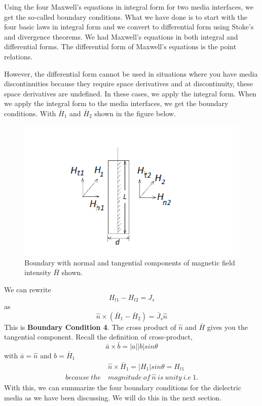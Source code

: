 Using the four Maxwell's equations in integral form for two media interfaces, we get the so-called boundary conditions. What we have done is to start with the four basic laws in integral form and we convert to differential form using Stoke's and divergence theorems. We had Maxwell's equations in both integral and differential forms. The differential form of Maxwell's equations is the point relations.

However, the differential form cannot be used in situations where you have media discontinuities because they require space derivatives and at discontinuity, these space derivatives are undefined. In these cases, we apply the integral form. When we apply the integral form to the media interfaces, we get the boundary conditions. With $\bar{H}_1$ and $\bar{H}_2$ shown in the figure below.
\begin{figure}[h]
\centering
\includegraphics[width=1\linewidth]{./graphics/diemedium4_2_2}
\caption{Boundary with normal and tangential components of magnetic field intensity $\bar{H}$ shown.}
\end{figure}

We can rewrite 
\begin{equation*}
H_{t1} - H_{t2} = J_s
\end{equation*}
as
\begin{equation}
\hat{n} \times (\bar{H}_1 - \bar{H}_2) = \bar{J}_s\hat{n}
\end{equation}
This is \textbf{Boundary Condition 4}. The cross product of $\hat{n}$ and $\bar{H}$ gives you the tangential component. Recall the definition of cross-product,
\begin{equation*}
\bar{a}\times\bar{b} = \left|a \right| \left|b \right|sin\theta 
\end{equation*}
with $\bar{a} = \hat{n}$ and $ b = \bar{H}_1$
\begin{align*}
&\hat{n}\times\bar{H}_1 = \left|H_1 \right|sin\theta = H_{t1} \\ because\ the\ & magnitude\ of\ \hat{n}\ is\ unity\ i.e\ 1.
\end{align*}
With this, we can summarize the four boundary conditions for the dielectric media as we have been discussing. We will do this in the next section.
